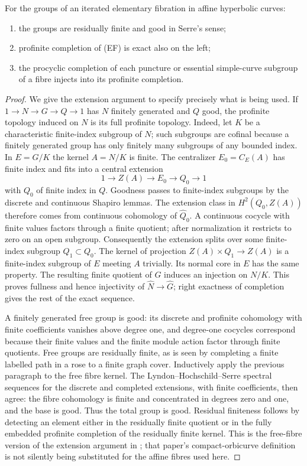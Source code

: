 \begin{lemma}\label{P3b-completion}
For the groups of an iterated elementary fibration in affine hyperbolic curves:
\begin{enumerate}[label=(\roman*)]
\item the groups are residually finite and good in Serre's sense;
\item profinite completion of (EF) is exact also on the left;
\item the procyclic completion of each puncture or essential simple-curve
subgroup of a fibre injects into its profinite completion.
\end{enumerate}
\end{lemma}
\begin{proof}
We give the extension argument to specify precisely what is being used.
If $1\to N\to G\to Q\to1$ has $N$ finitely generated and $Q$ good, the
profinite topology induced on $N$ is its full profinite topology.
Indeed, let $K$ be a characteristic finite-index subgroup of $N$; such
subgroups are cofinal because a finitely generated group has only finitely
many subgroups of any bounded index.  In $E=G/K$ the kernel $A=N/K$ is finite.
The centralizer $E_0=C_E(A)$ has finite index and fits into a central extension
\[
 1\to Z(A)\to E_0\to Q_0\to1
\]
with $Q_0$ of finite index in $Q$.  Goodness passes to finite-index subgroups
by the discrete and continuous Shapiro lemmas.  The extension class in
$H^2(Q_0,Z(A))$ therefore comes from continuous cohomology of $\widehat Q_0$.
A continuous cocycle with finite values factors through a finite quotient;
after normalization it restricts to zero on an open subgroup.  Consequently
the extension splits over some finite-index subgroup $Q_1\subset Q_0$.
The kernel of projection $Z(A)\times Q_1\to Z(A)$ is a finite-index subgroup
of $E$ meeting $A$ trivially.  Its normal core in $E$ has the same property.
The resulting finite quotient of $G$ induces an injection on $N/K$.
This proves fullness and hence injectivity of $\widehat N\to\widehat G$;
right exactness of completion gives the rest of the exact sequence.

A finitely generated free group is good: its discrete and profinite
cohomology with finite coefficients vanishes above degree one, and degree-one
cocycles correspond because their finite values and the finite module action
factor through finite quotients.  Free groups are residually finite, as is
seen by completing a finite labelled path in a rose to a finite graph cover.
Inductively apply the previous paragraph to the free fibre kernel.
The Lyndon--Hochschild--Serre spectral sequences for the discrete and completed
extensions, with finite coefficients, then agree: the fibre cohomology is
finite and concentrated in degrees zero and one, and the base is good.
Thus the total group is good.  Residual finiteness follows by detecting an
element either in the residually finite quotient or in the fully embedded
profinite completion of the residually finite kernel.  This is the free-fibre
version of the extension argument in
\citet[Lemma 10.9 and the proof of Lemma 10.11]{Bresciani2021}; that paper's
compact-orbicurve definition is not silently being substituted for the affine
fibres used here.


\end{proof}
